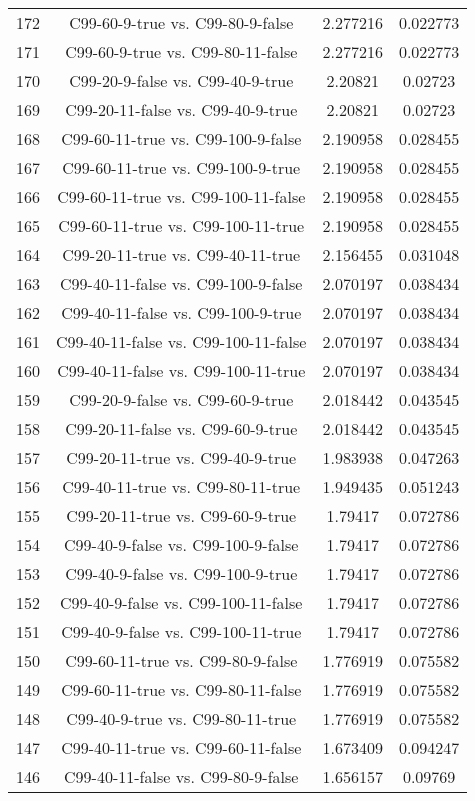\documentclass[a4paper,10pt]{article}
\begin{document}
\begin{landscape}
\begin{table}[!htp]
\begin{tabular}{cccc}
172&C99-60-9-true vs. C99-80-9-false&2.277216&0.022773\\
171&C99-60-9-true vs. C99-80-11-false&2.277216&0.022773\\
170&C99-20-9-false vs. C99-40-9-true&2.20821&0.02723\\
169&C99-20-11-false vs. C99-40-9-true&2.20821&0.02723\\
168&C99-60-11-true vs. C99-100-9-false&2.190958&0.028455\\
167&C99-60-11-true vs. C99-100-9-true&2.190958&0.028455\\
166&C99-60-11-true vs. C99-100-11-false&2.190958&0.028455\\
165&C99-60-11-true vs. C99-100-11-true&2.190958&0.028455\\
164&C99-20-11-true vs. C99-40-11-true&2.156455&0.031048\\
163&C99-40-11-false vs. C99-100-9-false&2.070197&0.038434\\
162&C99-40-11-false vs. C99-100-9-true&2.070197&0.038434\\
161&C99-40-11-false vs. C99-100-11-false&2.070197&0.038434\\
160&C99-40-11-false vs. C99-100-11-true&2.070197&0.038434\\
159&C99-20-9-false vs. C99-60-9-true&2.018442&0.043545\\
158&C99-20-11-false vs. C99-60-9-true&2.018442&0.043545\\
157&C99-20-11-true vs. C99-40-9-true&1.983938&0.047263\\
156&C99-40-11-true vs. C99-80-11-true&1.949435&0.051243\\
155&C99-20-11-true vs. C99-60-9-true&1.79417&0.072786\\
154&C99-40-9-false vs. C99-100-9-false&1.79417&0.072786\\
153&C99-40-9-false vs. C99-100-9-true&1.79417&0.072786\\
152&C99-40-9-false vs. C99-100-11-false&1.79417&0.072786\\
151&C99-40-9-false vs. C99-100-11-true&1.79417&0.072786\\
150&C99-60-11-true vs. C99-80-9-false&1.776919&0.075582\\
149&C99-60-11-true vs. C99-80-11-false&1.776919&0.075582\\
148&C99-40-9-true vs. C99-80-11-true&1.776919&0.075582\\
147&C99-40-11-true vs. C99-60-11-false&1.673409&0.094247\\
146&C99-40-11-false vs. C99-80-9-false&1.656157&0.09769\\

\end{tabular}
\end{table}
\end{landscape}
\end{document}
